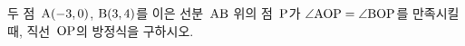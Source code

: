 두 점~$\mathrm{A}(-3{,}\mkern3mu\mathopen{}0)$, $\mathrm{B}(3{,}\mkern3mu\mathopen{}4)$를 이은 선분~$\mathrm{AB}$ 위의 점~$\mathrm{P}$가 $\angle\mathrm{AOP}=\angle\mathrm{BOP}$를 만족시킬 때, 직선~$\mathrm{OP}$의 방정식을 구하시오. 
